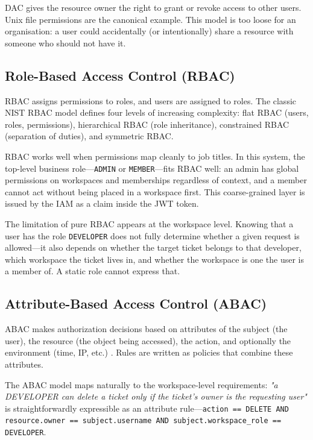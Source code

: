 DAC gives the resource owner the right to grant or revoke access to other users. Unix file permissions are the canonical example. This model is too loose for an organisation: a user could accidentally (or intentionally) share a resource with someone who should not have it.

\subsection{Role-Based Access Control (RBAC)}

RBAC assigns permissions to roles, and users are assigned to roles. The classic NIST RBAC model \cite{nist_rbac} defines four levels of increasing complexity: flat RBAC (users, roles, permissions), hierarchical RBAC (role inheritance), constrained RBAC (separation of duties), and symmetric RBAC.

RBAC works well when permissions map cleanly to job titles. In this system, the top-level business role—\texttt{ADMIN} or \texttt{MEMBER}—fits RBAC well: an admin has global permissions on workspaces and memberships regardless of context, and a member cannot act without being placed in a workspace first. This coarse-grained layer is issued by the IAM as a claim inside the JWT token.

The limitation of pure RBAC appears at the workspace level. Knowing that a user has the role \texttt{DEVELOPER} does not fully determine whether a given request is allowed—it also depends on whether the target ticket belongs to that developer, which workspace the ticket lives in, and whether the workspace is one the user is a member of. A static role cannot express that.

\subsection{Attribute-Based Access Control (ABAC)}

ABAC makes authorization decisions based on attributes of the subject (the user), the resource (the object being accessed), the action, and optionally the environment (time, IP, etc.) \cite{nist_abac}. Rules are written as policies that combine these attributes.

The ABAC model maps naturally to the workspace-level requirements: \textit{"a DEVELOPER can delete a ticket only if the ticket's owner is the requesting user"} is straightforwardly expressible as an attribute rule—\texttt{action == DELETE AND resource.owner == subject.username AND subject.workspace\_role == DEVELOPER}.

